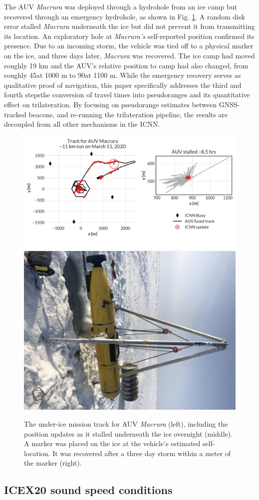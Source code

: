 \documentclass[preprint,TurnOnLineNumbers]{JASA}
\begin{document}
The AUV \emph{Macrura} was deployed through a hydrohole from an ice camp but recovered through an emergency hydrohole, as shown in Fig. \ref{fig:vehicleRecovery}.
A random disk error stalled \emph{Macrura} underneath the ice but did not prevent it from transmitting its location.
An exploratory hole at \emph{Macrura's} self-reported position confirmed its presence.
Due to an incoming storm, the vehicle was tied off to a physical marker on the ice, and three days later, \emph{Macrura} was recovered.
The ice camp had moved roughly 19 km and the AUV's relative position to camp had also changed, from roughly 45\textdegree at 1000 m to 90\textdegree at 1100 m.
While the emergency recovery serves as qualitative proof of navigation, this paper specifically addresses the third and fourth steps\textemdash the conversion of travel times into pseudoranges and its quantitative effect on trilateration.
By focusing on pseudorange estimates between GNSS-tracked beacons, and re-running the trilateration pipeline, the results are decoupled from all other mechanisms in the ICNN.

\begin{figure}[!ht]
    \centering
    \includegraphics[width=0.7\columnwidth,trim={0 100 0 0},clip]{Fig2a.pdf} \hfill
    \includegraphics[width=0.25\columnwidth]{Fig2b.jpg}
    \caption{The under-ice mission track for AUV \emph{Macrura} (left), including the position updates as it stalled underneath the ice overnight (middle). A marker was placed on the ice at the vehicle's estimated self-location. It was recovered after a three day storm within a meter of the marker (right).}
    \label{fig:vehicleRecovery}
\end{figure}

\subsection{ICEX20 sound speed conditions}
\end{document}
